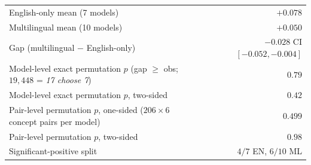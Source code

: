 \begin{table}[h]
\medskip
\begin{tabular}{lr}
\toprule
English-only mean (7 models) & $+0.078$ \\
Multilingual mean (10 models) & $+0.050$ \\
Gap (multilingual $-$ English-only) & $-0.028$ \quad CI $[-0.052,-0.004]$ \\
Model-level exact permutation $p$ (gap $\geq$ obs; $19{,}448$ = \emph{17 choose 7}) & $0.79$ \\
Model-level exact permutation $p$, two-sided & $0.42$ \\
Pair-level permutation $p$, one-sided ($206{\times}6$ concept pairs per model) & $0.499$ \\
Pair-level permutation $p$, two-sided & $0.98$ \\
Significant-positive split & $4/7$ EN, $6/10$ ML \\
\bottomrule
\end{tabular}
\end{table}


